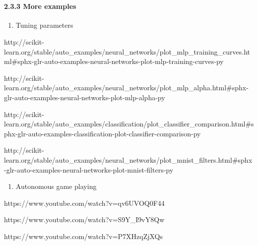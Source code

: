 \documentclass[11pt]{article}
\providecommand{\tightlist}{%
      \setlength{\itemsep}{0pt}\setlength{\parskip}{0pt}}
\begin{document}
    \begin{center}
    \end{center}
    { \hspace*{\fill} \\}
    
    \paragraph{2.3.3 More examples}\label{more-examples}

\begin{enumerate}
\def\labelenumi{\alph{enumi})}
\tightlist
\item
  Tuning parameters
\end{enumerate}

http://scikit-learn.org/stable/auto\_examples/neural\_networks/plot\_mlp\_training\_curves.html\#sphx-glr-auto-examples-neural-networks-plot-mlp-training-curves-py

http://scikit-learn.org/stable/auto\_examples/neural\_networks/plot\_mlp\_alpha.html\#sphx-glr-auto-examples-neural-networks-plot-mlp-alpha-py

http://scikit-learn.org/stable/auto\_examples/classification/plot\_classifier\_comparison.html\#sphx-glr-auto-examples-classification-plot-classifier-comparison-py

http://scikit-learn.org/stable/auto\_examples/neural\_networks/plot\_mnist\_filters.html\#sphx-glr-auto-examples-neural-networks-plot-mnist-filters-py

\begin{enumerate}
\def\labelenumi{\alph{enumi})}
\setcounter{enumi}{1}
\tightlist
\item
  Autonomous game playing
\end{enumerate}

https://www.youtube.com/watch?v=qv6UVOQ0F44

https://www.youtube.com/watch?v=S9Y\_I9vY8Qw

https://www.youtube.com/watch?v=P7XHzqZjXQs


    
    
    
    
\end{document}
